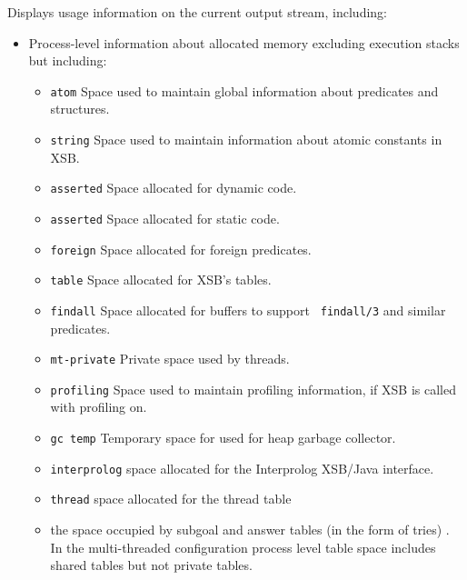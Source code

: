 \begin{description}
%
Displays usage information on the current output stream, including: 
\begin{itemize} 
\item Process-level information about allocated memory excluding
  execution stacks but including: 
\begin{itemize}
\item {\tt atom} Space used to maintain global information about
  predicates and structures. 
%
\item {\tt string} Space used to maintain information about atomic
  constants in XSB.
%
\item {\tt asserted} Space allocated for dynamic code.
%
\item {\tt asserted} Space allocated for static code.
%
\item {\tt foreign} Space allocated for foreign predicates.
%
\item {\tt table} Space allocated for XSB's tables.
%
\item {\tt findall} Space allocated for buffers to support {\tt
  findall/3} and similar predicates.
%
\item {\tt mt-private} Private space used by threads.
%
\item {\tt profiling} Space used to maintain profiling information, if
  XSB is called with profiling on.
%
\item {\tt gc temp} Temporary space for used for heap garbage
  collector.
%
\item {\tt interprolog} space allocated for the Interprolog XSB/Java
  interface.
%
\item {\tt thread} space allocated for the thread table
%
\item the space occupied by subgoal and answer tables (in the form of
  tries) \cite{RRSSW98,CuSW99b,TST99}.  In the multi-threaded
  configuration process level table space includes shared tables but
  not private tables.
\end{itemize}


\end{itemize}
\end{description}
